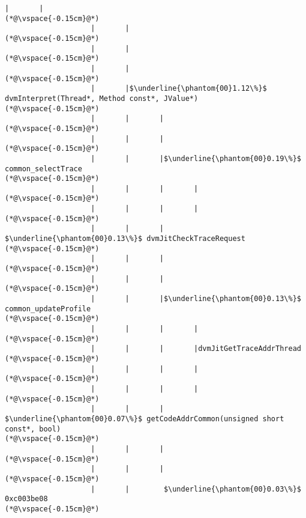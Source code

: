 \begin{lstlisting}[caption=20 viiteparametria (C$\to$Java) , label=profile:C2JBenchmark00206, numberbychapter=true, frame=lines]
                    |       |
(*@\vspace{-0.15cm}@*)
                    |       |
(*@\vspace{-0.15cm}@*)
                    |       |
(*@\vspace{-0.15cm}@*)
                    |       |
(*@\vspace{-0.15cm}@*)
                    |       |$\underline{\phantom{00}1.12\%}$ dvmInterpret(Thread*, Method const*, JValue*)
(*@\vspace{-0.15cm}@*)
                    |       |       |
(*@\vspace{-0.15cm}@*)
                    |       |       |
(*@\vspace{-0.15cm}@*)
                    |       |       |$\underline{\phantom{00}0.19\%}$ common_selectTrace
(*@\vspace{-0.15cm}@*)
                    |       |       |       |
(*@\vspace{-0.15cm}@*)
                    |       |       |       |
(*@\vspace{-0.15cm}@*)
                    |       |       |        $\underline{\phantom{00}0.13\%}$ dvmJitCheckTraceRequest
(*@\vspace{-0.15cm}@*)
                    |       |       |
(*@\vspace{-0.15cm}@*)
                    |       |       |
(*@\vspace{-0.15cm}@*)
                    |       |       |$\underline{\phantom{00}0.13\%}$    common_updateProfile
(*@\vspace{-0.15cm}@*)
                    |       |       |       |
(*@\vspace{-0.15cm}@*)
                    |       |       |       |dvmJitGetTraceAddrThread
(*@\vspace{-0.15cm}@*)
                    |       |       |       |
(*@\vspace{-0.15cm}@*)
                    |       |       |       |
(*@\vspace{-0.15cm}@*)
                    |       |       |        $\underline{\phantom{00}0.07\%}$ getCodeAddrCommon(unsigned short const*, bool)
(*@\vspace{-0.15cm}@*)
                    |       |       |
(*@\vspace{-0.15cm}@*)
                    |       |       |
(*@\vspace{-0.15cm}@*)
                    |       |        $\underline{\phantom{00}0.03\%}$ 0xc003be08
(*@\vspace{-0.15cm}@*)

\end{lstlisting}
